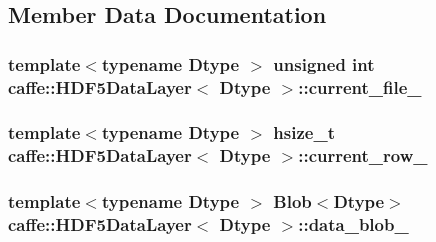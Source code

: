 \subsection{Member Data Documentation}
\hypertarget{classcaffe_1_1_h_d_f5_data_layer_aa13b2e2012927eb433d007eb0cfcf8a7}{
\subsubsection[{current\+\_\+file\+\_\+}]{\setlength{\rightskip}{0pt plus 5cm}template$<$typename Dtype $>$ unsigned int {\bf caffe\+::\+H\+D\+F5\+Data\+Layer}$<$ Dtype $>$\+::current\+\_\+file\+\_\+\hspace{0.3cm}{\ttfamily [protected]}}}\label{classcaffe_1_1_h_d_f5_data_layer_aa13b2e2012927eb433d007eb0cfcf8a7}
\hypertarget{classcaffe_1_1_h_d_f5_data_layer_a375f447a432bcd2ba94859b5b270ac96}{
\subsubsection[{current\+\_\+row\+\_\+}]{\setlength{\rightskip}{0pt plus 5cm}template$<$typename Dtype $>$ hsize\+\_\+t {\bf caffe\+::\+H\+D\+F5\+Data\+Layer}$<$ Dtype $>$\+::current\+\_\+row\+\_\+\hspace{0.3cm}{\ttfamily [protected]}}}\label{classcaffe_1_1_h_d_f5_data_layer_a375f447a432bcd2ba94859b5b270ac96}
\hypertarget{classcaffe_1_1_h_d_f5_data_layer_a9a70b53ef7435b4d565736fe8e3881ac}{
\subsubsection[{data\+\_\+blob\+\_\+}]{\setlength{\rightskip}{0pt plus 5cm}template$<$typename Dtype $>$ {\bf Blob}$<$Dtype$>$ {\bf caffe\+::\+H\+D\+F5\+Data\+Layer}$<$ Dtype $>$\+::data\+\_\+blob\+\_\+\hspace{0.3cm}{\ttfamily [protected]}}}\label{classcaffe_1_1_h_d_f5_data_layer_a9a70b53ef7435b4d565736fe8e3881ac}
